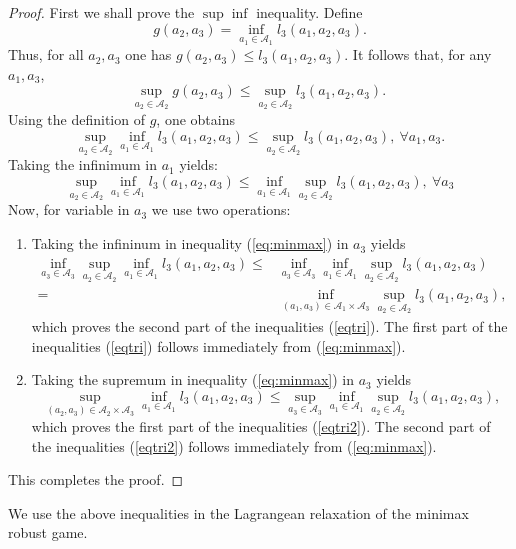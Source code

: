 \documentclass{article}
\begin{document}
\begin{proof}
First we shall prove the $\sup \inf$ inequality. Define
$$g(a_2,a_3) = \inf_{a_1\in \mathcal{A}_1}l_3(a_1,a_2, a_3).
$$
Thus, for all $a_2,a_3$ one has $g(a_2,a_3) \leq l_3(a_1,a_2, a_3)$. It follows that, for any $a_1, a_3$,
$$\sup_{a_2\in \mathcal{A}_2} g(a_2,a_3)\leq \sup_{a_2\in \mathcal{A}_2} l_3(a_1,a_2, a_3).\
$$
Using the definition of $g$, one obtains
$$\sup_{a_2\in \mathcal{A}_2} \inf_{a_1\in \mathcal{A}_1}l_3(a_1,a_2, a_3)\leq \sup_{a_2\in \mathcal{A}_2} l_3(a_1,a_2, a_3),\ \forall a_1,a_3.
$$
Taking the infinimum in $a_1$ yields:
\begin{equation}\label{eq:minmax}
\sup_{a_2\in \mathcal{A}_2} \inf_{a_1\in \mathcal{A}_1}l_3(a_1,a_2, a_3)\leq  \inf_{a_1\in \mathcal{A}_1}\sup_{a_2\in \mathcal{A}_2} l_3(a_1,a_2, a_3),\  \forall a_3
\end{equation}
Now, for variable in $a_3$ we use two operations:
\begin{enumerate}
\item Taking the infininum in inequality (\ref{eq:minmax}) in $a_3$ yields
\begin{equation}
\begin{aligned}
\inf_{a_3 \in \mathcal{A}_3} \sup_{a_2\in\mathcal{A}_2} \inf_{a_1\in \mathcal{A}_1}l_3(a_1,a_2, a_3)
\leq &\inf_{a_3\in\mathcal{A}_3}\inf_{a_1\in\mathcal{A}_1}\sup_{a_2\in\mathcal{A}_2} l_3(a_1,a_2, a_3) \\
= &\inf_{(a_1,a_3) \in \mathcal{A}_1 \times \mathcal{A}_3 } \sup_{a_2 \in \mathcal{A}_2} l_3(a_1,a_2, a_3),
\end{aligned}
\end{equation}
which proves the second part of the inequalities (\ref{eqtri}). The first part of the inequalities (\ref{eqtri}) follows immediately from (\ref{eq:minmax}).
\item Taking the supremum in inequality (\ref{eq:minmax}) in $a_3$ yields
$$\sup_{(a_2,a_3)\in \mathcal{A}_2\times \mathcal{A}_3} \inf_{a_1\in \mathcal{A}_1}l_3(a_1,a_2, a_3) \leq   \sup_{a_3\in \mathcal{A}_3}\inf_{a_1\in \mathcal{A}_1}\sup_{a_2\in \mathcal{A}_2} l_3(a_1,a_2, a_3),
$$
which proves the first part of the inequalities (\ref{eqtri2}). The second part of the inequalities (\ref{eqtri2}) follows immediately from (\ref{eq:minmax}).
\end{enumerate}
This completes the proof.
\end{proof}
We use the above inequalities in the Lagrangean relaxation of the minimax robust game.
\end{document}
